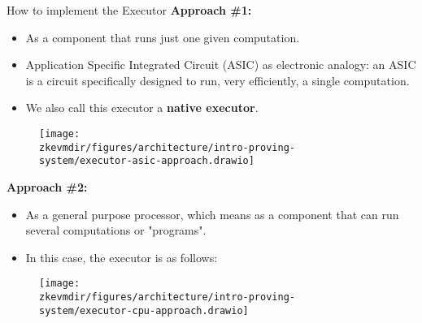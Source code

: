 \begin{frame} [allowframebreaks] {How to implement the Executor}
\textbf{Approach \#1:}
    \begin{itemize}
    \item As a component that runs just one given computation.
    \item Application Specific Integrated Circuit (ASIC) as electronic analogy: an ASIC
    is a circuit specifically designed to run, very efficiently, a single computation.
    \item We also call this executor a \textbf{native executor}.
    \end{itemize}

\begin{figure}
\texttt{[image: \\zkevmdir/figures/architecture/intro-proving-system/executor-asic-approach.drawio]}
\end{figure}


\framebreak
\textbf{Approach \#2:}
\begin{itemize}
\item As a general purpose processor, which means as a component that can run several computations or "programs".
\item In this case, the executor is as follows:
\end{itemize}
\begin{figure}[H]
\centering
\texttt{[image: \\zkevmdir/figures/architecture/intro-proving-system/executor-cpu-approach.drawio]}
\end{figure}
\end{frame}





